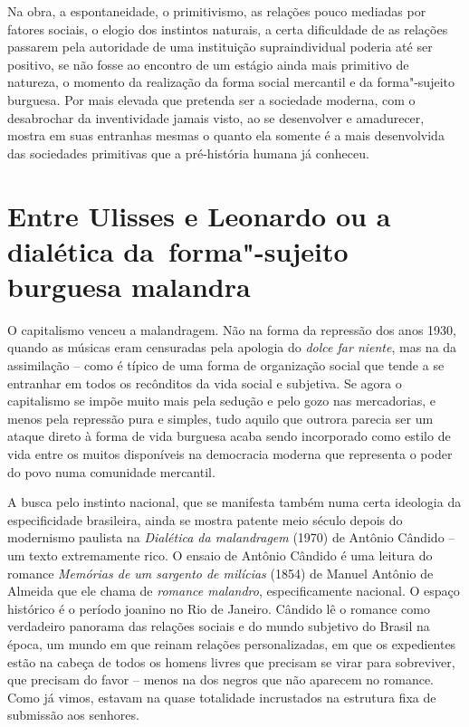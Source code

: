 Na obra, a espontaneidade, o primitivismo, as relações pouco mediadas
por fatores sociais, o elogio dos instintos naturais, a certa
dificuldade de as relações passarem pela autoridade de uma instituição
supraindividual poderia até ser positivo, se não fosse ao encontro de um
estágio ainda mais primitivo de natureza, o momento da realização da
forma social mercantil e da forma"-sujeito burguesa. Por mais elevada que
pretenda ser a sociedade moderna, com o desabrochar da inventividade
jamais visto, ao se desenvolver e amadurecer, mostra em suas entranhas
mesmas o quanto ela somente é a mais desenvolvida das sociedades
primitivas que a pré-história humana já conheceu.

\section*{Entre Ulisses e Leonardo ou a dialética da~forma"-sujeito burguesa malandra}

O capitalismo venceu a malandragem. Não na forma da repressão dos anos
1930, quando as músicas eram censuradas pela apologia do \emph{dolce far
niente}, mas na da assimilação -- como é típico de uma forma de
organização social que tende a se entranhar em todos os recônditos da
vida social e subjetiva. Se agora o capitalismo se impõe muito mais pela
sedução e pelo gozo nas mercadorias, e menos pela repressão pura e
simples, tudo aquilo que outrora parecia ser um ataque direto à forma de
vida burguesa acaba sendo incorporado como estilo de vida entre os
muitos disponíveis na democracia moderna que representa o poder do povo
numa comunidade mercantil.

A busca pelo instinto nacional, que se manifesta também numa certa
ideologia da especificidade brasileira, ainda se mostra patente meio
século depois do modernismo paulista na \emph{Dialética da malandragem}
(1970) de Antônio Cândido -- um texto extremamente rico. O
ensaio de Antônio Cândido é uma leitura do romance \emph{Memórias de um
sargento de milícias} (1854) de Manuel Antônio de Almeida que ele chama
de \emph{romance malandro}, especificamente nacional. O espaço histórico
é o período joanino no Rio de Janeiro. Cândido lê o romance como
verdadeiro panorama das relações sociais e do mundo subjetivo do Brasil
na época, um mundo em que reinam relações personalizadas, em que os
expedientes estão na cabeça de todos os homens livres que precisam se
virar para sobreviver, que precisam do favor -- menos na dos negros que
não aparecem no romance. Como já vimos, estavam na quase totalidade
incrustados na estrutura fixa de submissão aos senhores.

